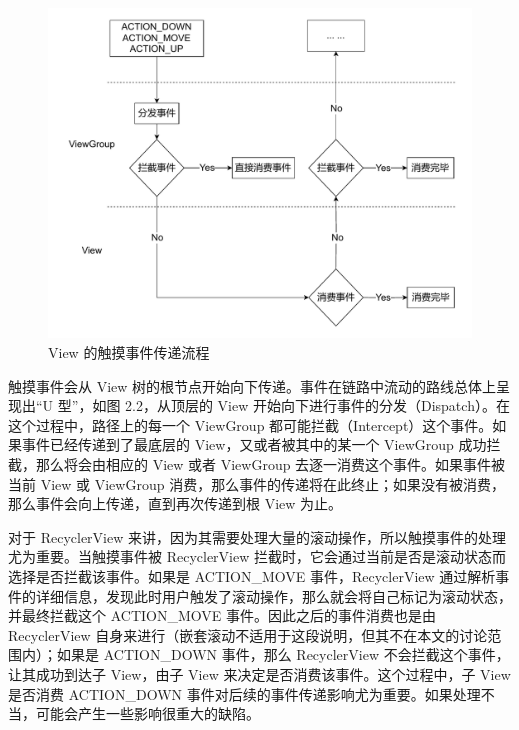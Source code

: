 \begin{figure}[htbp]
    \centering
    \begin{adjustbox}{max width=\textwidth}
        \includegraphics[scale=0.7]{assets/touch-dispatch.pdf}
    \end{adjustbox}
    \caption{View 的触摸事件传递流程}
\end{figure}

触摸事件会从 View 树的根节点开始向下传递。事件在链路中流动的路线总体上呈现出“U 型”，如图 2.2，从顶层的 View 开始向下进行事件的分发（Dispatch）。在这个过程中，路径上的每一个 ViewGroup 都可能拦截（Intercept）这个事件\cite{wu2017appcheck}。如果事件已经传递到了最底层的 View，又或者被其中的某一个 ViewGroup 成功拦截，那么将会由相应的 View 或者 ViewGroup 去逐一消费这个事件。如果事件被当前 View 或 ViewGroup 消费，那么事件的传递将在此终止；如果没有被消费，那么事件会向上传递，直到再次传递到根 View 为止。

对于 RecyclerView 来讲，因为其需要处理大量的滚动操作，所以触摸事件的处理尤为重要。当触摸事件被 RecyclerView 拦截时，它会通过当前是否是滚动状态而选择是否拦截该事件。如果是 ACTION\_MOVE 事件，RecyclerView 通过解析事件的详细信息，发现此时用户触发了滚动操作，那么就会将自己标记为滚动状态，并最终拦截这个 ACTION\_MOVE 事件。因此之后的事件消费也是由 RecyclerView 自身来进行（嵌套滚动不适用于这段说明，但其不在本文的讨论范围内）；如果是 ACTION\_DOWN 事件，那么 RecyclerView 不会拦截这个事件，让其成功到达子 View，由子 View 来决定是否消费该事件。这个过程中，子 View 是否消费 ACTION\_DOWN 事件对后续的事件传递影响尤为重要。如果处理不当，可能会产生一些影响很重大的缺陷。


